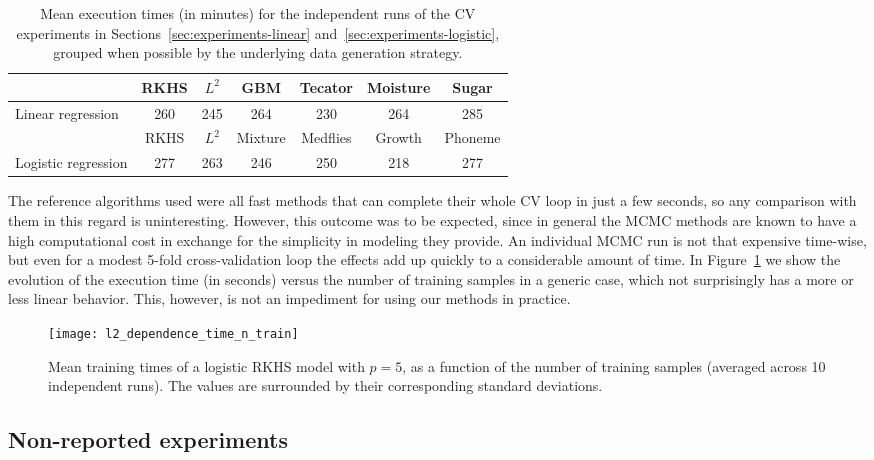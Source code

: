 \begin{table}[ht!]
  \centering
  \begin{tabular}{lcccccc}
\toprule
  &            RKHS &           \(L^2\) &           GBM &        Tecator & Moisture & Sugar \\
\midrule
Linear regression & 260 & 245 & 264 & 230 & 264 & 285\\
\bottomrule

  &            RKHS &           \(L^2\) &           Mixture &        Medflies & Growth & Phoneme \\
\toprule
Logistic regression & 277 & 263 & 246 & 250 & 218 & 277\\
\bottomrule
\end{tabular}
  \caption{Mean execution times (in minutes) for the independent runs of the CV experiments in Sections~\ref{sec:experiments-linear} and~\ref{sec:experiments-logistic}, grouped when possible by the underlying data generation strategy.}
\end{table}

The reference algorithms used were all fast methods that can complete their whole CV loop in just a few seconds, so any comparison with them in this regard is uninteresting. However, this outcome was to be expected, since in general the MCMC methods are known to have a high computational cost in exchange for the simplicity in modeling they provide. An individual MCMC run is not that expensive time-wise, but even for a modest 5-fold cross-validation loop the effects add up quickly to a considerable amount of time. In Figure~\ref{fig:dependence_time_n_train} we show the evolution of the execution time (in seconds) versus the number of training samples in a generic case, which not surprisingly has a more or less linear behavior. This, however, is not an impediment for using our methods in practice.

\begin{figure}[ht!]
  \centering
  \texttt{[image: l2\_dependence\_time\_n\_train]}
  \caption{Mean training times of a logistic RKHS model with \(p=5\), as a function of the number of training samples (averaged across 10 independent runs). The values are surrounded by their corresponding standard deviations.}\label{fig:dependence_time_n_train}
\end{figure}

\subsection*{Non-reported experiments}


